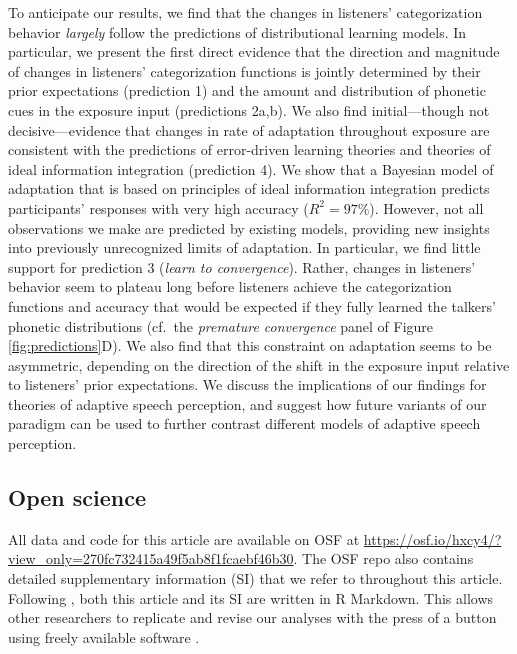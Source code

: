 \documentclass[
  11pt,
  man,mask,floatsintext]{apa6}
\begin{document}
To anticipate our results, we find that the changes in listeners' categorization behavior \emph{largely} follow the predictions of distributional learning models. In particular, we present the first direct evidence that the direction and magnitude of changes in listeners' categorization functions is jointly determined by their prior expectations (prediction 1) and the amount and distribution of phonetic cues in the exposure input (predictions 2a,b). We also find initial---though not decisive---evidence that changes in rate of adaptation throughout exposure are consistent with the predictions of error-driven learning theories and theories of ideal information integration (prediction 4). We show that a Bayesian model of adaptation that is based on principles of ideal information integration \autocites[the ideal adaptor,][]{kleinschmidt-jaeger2015,kleinschmidt-jaeger2016} predicts participants' responses with very high accuracy (\(R^2 = 97\%\)). However, not all observations we make are predicted by existing models, providing new insights into previously unrecognized limits of adaptation. In particular, we find little support for prediction 3 (\emph{learn to convergence}). Rather, changes in listeners' behavior seem to plateau long before listeners achieve the categorization functions and accuracy that would be expected if they fully learned the talkers' phonetic distributions (cf.~the \emph{premature convergence} panel of Figure \ref{fig:predictions}D). We also find that this constraint on adaptation seems to be asymmetric, depending on the direction of the shift in the exposure input relative to listeners' prior expectations. We discuss the implications of our findings for theories of adaptive speech perception, and suggest how future variants of our paradigm can be used to further contrast different models of adaptive speech perception.

\subsection{Open science}\label{open-science}

All data and code for this article are available on OSF at \url{https://osf.io/hxcy4/?view_only=270fc732415a49f5ab8f1fcaebf46b30}. The OSF repo also contains detailed supplementary information (SI) that we refer to throughout this article. Following \textcite{xie2023}, both this article and its SI are written in R Markdown. This allows other researchers to replicate and revise our analyses with the press of a button using freely available software \autocites[R,][]{R-base}[see also SI, \ref{sec:software}]{RStudio}.
\end{document}
